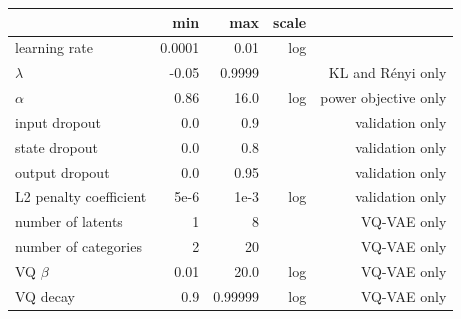 \begin{subappendices}
\begin{table}
  \centering
  \begin{tabular}{@{}lrrrr@{}}
    & min & max & scale & \\
    \midrule
    learning rate & 0.0001 & 0.01 & log & \\
    $\lambda$ & -0.05 & 0.9999 & & KL and Rényi only \\
    $\alpha$ & 0.86 & 16.0 & log & power objective only \\
    input dropout & 0.0 & 0.9 & & validation only \\
    state dropout & 0.0 & 0.8 & & validation only \\
    output dropout & 0.0 & 0.95 & & validation only \\
    L2 penalty coefficient & 5e-6 & 1e-3 & log & validation only \\
    number of latents & 1 & 8 & & VQ-VAE only \\
    number of categories & 2 & 20 & & VQ-VAE only \\
    VQ $\beta$ & 0.01 & 20.0 & log & VQ-VAE only \\
    VQ decay & 0.9 & 0.99999 & log & VQ-VAE only \\
    \midrule
  \end{tabular}
\end{table}

\end{subappendices}
